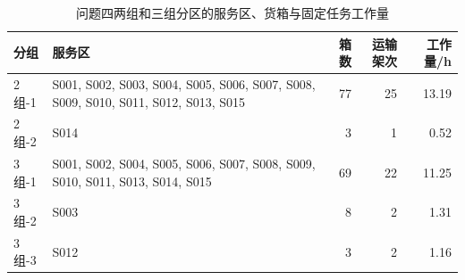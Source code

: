 \begin{table}[H]\centering\scriptsize
\caption{问题四两组和三组分区的服务区、货箱与固定任务工作量}\label{tab:q4_groups}
\begin{tabular}{l>{\raggedright\arraybackslash}p{8.0cm}rrr}
\toprule
分组 & 服务区 & 箱数 & 运输架次 & 工作量/h\\\midrule
2组-1 & S001, S002, S003, S004, S005, S006, S007, S008, S009, S010, S011, S012, S013, S015 & 77 & 25 & 13.19\\
2组-2 & S014 & 3 & 1 & 0.52\\
3组-1 & S001, S002, S004, S005, S006, S007, S008, S009, S010, S011, S013, S014, S015 & 69 & 22 & 11.25\\
3组-2 & S003 & 8 & 2 & 1.31\\
3组-3 & S012 & 3 & 2 & 1.16\\
\bottomrule\end{tabular}
\end{table}
